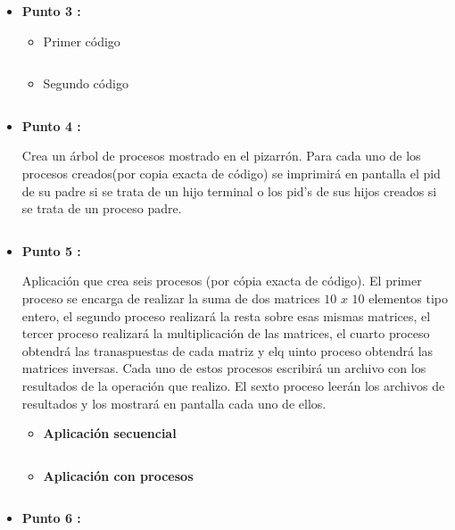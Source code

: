 \documentclass[12pt]{article}
\begin{document}
        	\begin{itemize}
        	    \item[\Checkmark] \textbf{Punto 3 :}
                    \begin{itemize}
                        \item Primer código 
                   	       \inputminted{octave}{Code/Linux/3_1.c}
                        \item Segundo código
                           \inputminted{octave}{Code/Linux/3_2.c}
                    \end{itemize}

                \item[\Checkmark] \textbf{Punto 4 :}

                    Crea un árbol de procesos mostrado en el pizarrón. Para cada uno de los procesos creados(por copia exacta de código) se imprimirá en pantalla el pid de su padre si se trata de un hijo terminal o los pid's de sus hijos creados si se trata de un proceso padre. 
        	        \inputminted{octave}{Code/Linux/4.c}
                
                \item[\Checkmark] \textbf{Punto 5 :}
        	        
                    Aplicación que crea seis procesos (por cópia exacta de código). El primer proceso se encarga de realizar la suma de dos matrices $10$ $x$ $10$ elementos tipo entero, el segundo proceso realizará la resta sobre esas mismas matrices, el tercer proceso realizará la multiplicación de las matrices, el cuarto proceso obtendrá las tranaspuestas de cada matriz y elq uinto proceso obtendrá las matrices inversas. Cada uno de estos procesos escribirá un archivo con los resultados de la operación que realizo. El sexto proceso leerán los archivos de resultados y los mostrará en pantalla cada uno de ellos.

                    \begin{itemize}
                        \item \textbf{Aplicación secuencial}
                            \inputminted{octave}{Code/Linux/5_1.c}
                        \item \textbf{Aplicación con procesos}
                            \inputminted{octave}{Code/Linux/5_2.c}  
                    \end{itemize}
                
                \item[\Checkmark] \textbf{Punto 6 :}
        	        

\end{itemize}
\end{document}

